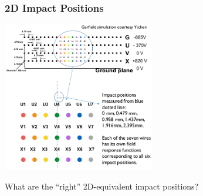 \documentclass[xcolor=dvipsnames]{beamer}
\begin{document}
\begin{frame}
  \frametitle{2D Impact Positions}
  
  \begin{center}
    \includegraphics[width=0.5\textwidth,clip,trim=5cm 5cm 0cm 8cm]{xiaoyue-impact-positions.png}    

    \vfill

    What are the ``right'' 2D-equivalent impact positions?
  \end{center}
  

\end{frame}

\end{document}
